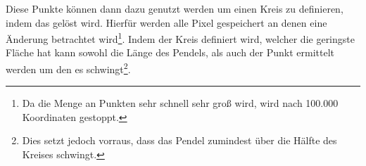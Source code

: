 Diese Punkte können dann dazu genutzt werden um einen Kreis zu definieren, indem das  gelöst wird.
Hierfür werden alle Pixel gespeichert an denen eine Änderung betrachtet wird\footnote{Da die Menge an Punkten sehr schnell sehr groß wird, wird nach 100.000 Koordinaten gestoppt.}.
Indem der Kreis definiert wird, welcher die geringste Fläche hat kann sowohl die Länge des Pendels, als auch der Punkt ermittelt werden um den es schwingt\footnote{Dies setzt jedoch vorraus, dass das Pendel zumindest über die Hälfte des Kreises schwingt.}.



